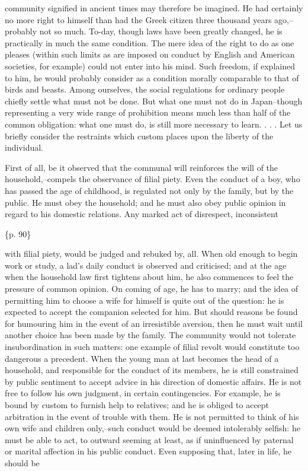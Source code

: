 community signified in ancient times may therefore be imagined. He had certainly no more right to himself than had the Greek citizen three thousand years ago,--probably not so much. To-day, though laws have been greatly changed, he is practically in much the same condition. The mere idea of the right to do as one pleases (within such limits as are imposed on conduct by English and American societies, for example) could not enter into his mind. Such freedom, if explained to him, he would probably consider as a condition morally comparable to that of birds and beasts. Among ourselves, the social regulations for ordinary people chiefly settle what must not be done. But what one must not do in Japan--though representing a very wide range of prohibition means much less than half of the common obligation: what one must do, is still more necessary to learn. . . . Let us briefly consider the restraints which custom places upon the liberty of the individual.



First of all, be it observed that the communal will reinforces the will of the household,--compels the observance of filial piety. Even the conduct of a boy, who has passed the age of childhood, is regulated not only by the family, but by the public. He must obey the household; and he must also obey public opinion in regard to his domestic relations. Any marked act of disrespect, inconsistent

\{p. 90\}

with filial piety, would be judged and rebuked by, all. When old enough to begin work or study, a lad's daily conduct is observed and criticised; and at the age when the household law first tightens about him, he also commences to feel the pressure of common opinion. On coming of age, he has to marry; and the idea of permitting him to choose a wife for himself is quite out of the question: he is expected to accept the companion selected for him. But should reasons be found for humouring him in the event of an irresistible aversion, then he must wait until another choice has been made by the family. The community would not tolerate insubordination in such matters: one example of filial revolt would constitute too dangerous a precedent. When the young man at last becomes the head of a household, and responsible for the conduct of its members, he is still constrained by public sentiment to accept advice in his direction of domestic affairs. He is not free to follow his own judgment, in certain contingencies. For example, he is bound by custom to furnish help to relatives; and he is obliged to accept arbitration in the event of trouble with them. He is not permitted to think of his own wife and children only,--such conduct would be deemed intolerably selfish: he must be able to act, to outward seeming at least, as if uninfluenced by paternal or marital affection in his public conduct. Even supposing that, later in life, he should be

